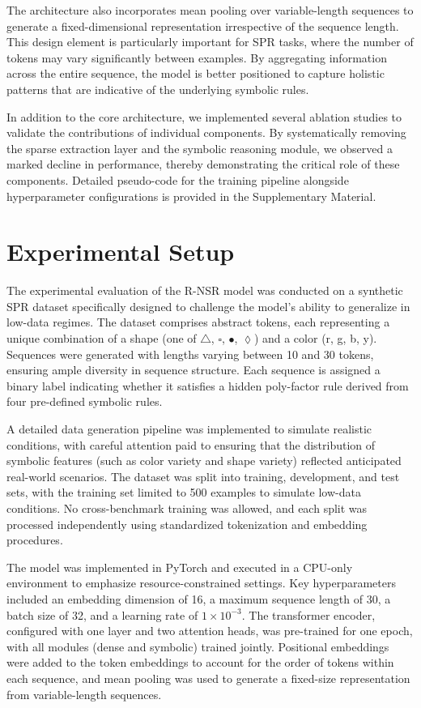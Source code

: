 \documentclass{article}
\begin{document}
The architecture also incorporates mean pooling over variable-length sequences to generate a fixed-dimensional representation irrespective of the sequence length. This design element is particularly important for SPR tasks, where the number of tokens may vary significantly between examples. By aggregating information across the entire sequence, the model is better positioned to capture holistic patterns that are indicative of the underlying symbolic rules.

In addition to the core architecture, we implemented several ablation studies to validate the contributions of individual components. By systematically removing the sparse extraction layer and the symbolic reasoning module, we observed a marked decline in performance, thereby demonstrating the critical role of these components. Detailed pseudo-code for the training pipeline alongside hyperparameter configurations is provided in the Supplementary Material.

\section{Experimental Setup}
The experimental evaluation of the R-NSR model was conducted on a synthetic SPR dataset specifically designed to challenge the model's ability to generalize in low-data regimes. The dataset comprises abstract tokens, each representing a unique combination of a shape (one of \(\triangle\), \(\square\), \(\bullet\), \(\lozenge\)) and a color (r, g, b, y). Sequences were generated with lengths varying between 10 and 30 tokens, ensuring ample diversity in sequence structure. Each sequence is assigned a binary label indicating whether it satisfies a hidden poly-factor rule derived from four pre-defined symbolic rules.

A detailed data generation pipeline was implemented to simulate realistic conditions, with careful attention paid to ensuring that the distribution of symbolic features (such as color variety and shape variety) reflected anticipated real-world scenarios. The dataset was split into training, development, and test sets, with the training set limited to 500 examples to simulate low-data conditions. No cross-benchmark training was allowed, and each split was processed independently using standardized tokenization and embedding procedures.

The model was implemented in PyTorch and executed in a CPU-only environment to emphasize resource-constrained settings. Key hyperparameters included an embedding dimension of 16, a maximum sequence length of 30, a batch size of 32, and a learning rate of \(1 \times 10^{-3}\). The transformer encoder, configured with one layer and two attention heads, was pre-trained for one epoch, with all modules (dense and symbolic) trained jointly. Positional embeddings were added to the token embeddings to account for the order of tokens within each sequence, and mean pooling was used to generate a fixed-size representation from variable-length sequences.
\end{document}
